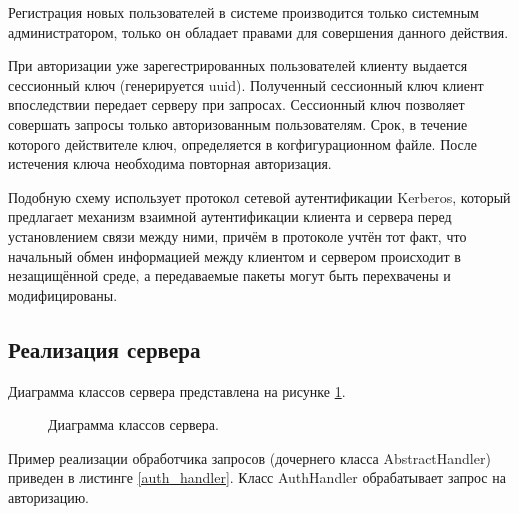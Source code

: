 \documentclass[a4paper,14pt]{article}
\begin{document}
Регистрация новых пользователей в системе производится только системным администратором, только он обладает правами для совершения данного действия.

При авторизации уже зарегестрированных пользователей клиенту выдается сессионный ключ (генерируется uuid). Полученный сессионный ключ клиент впоследствии передает серверу при запросах. Сессионный ключ позволяет совершать запросы только авторизованным пользователям. Срок, в течение которого действителе ключ, определяется в когфигурационном файле. После истечения ключа необходима повторная авторизация.

Подобную схему использует протокол сетевой аутентификации Kerberos, который предлагает механизм взаимной аутентификации клиента и сервера перед установлением связи между ними, причём в протоколе учтён тот факт, что начальный обмен информацией между клиентом и сервером происходит в незащищённой среде, а передаваемые пакеты могут быть перехвачены и модифицированы.

\subsection{Реализация сервера}

Диаграмма классов сервера представлена на рисунке \ref{fig:server_classes}.

\begin{figure}[!h]
	\caption{Диаграмма классов сервера.}
	\label{fig:server_classes}
\end{figure}

Пример реализации обработчика запросов (дочернего класса AbstractHandler) приведен в листинге \ref{auth_handler}. Класс AuthHandler обрабатывает запрос на авторизацию.
\end{document}
